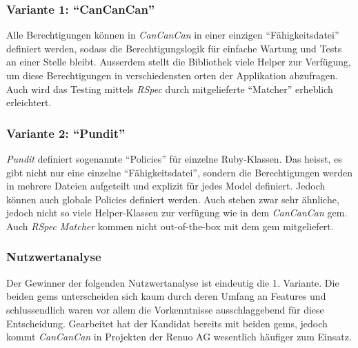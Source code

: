 \subsubsection{Variante 1: \enquote{CanCanCan}}

Alle Berechtigungen können in \emph{CanCanCan} in einer einzigen \enquote{Fähigkeitsdatei} definiert werden, sodass die Berechtigungslogik für einfache Wartung und Tests an einer Stelle bleibt.
Ausserdem stellt die Bibliothek viele Helper zur Verfügung, um diese Berechtigungen in verschiedensten orten der Applikation abzufragen. Auch wird das Testing mittels \emph{RSpec} durch mitgelieferte \enquote{Matcher} erheblich erleichtert.

\subsubsection{Variante 2: \enquote{Pundit}}

\emph{Pundit} definiert sogenannte \enquote{Policies} für einzelne Ruby-Klassen. Das heisst, es gibt nicht nur eine einzelne \enquote{Fähigkeitsdatei},
sondern die Berechtigungen werden in mehrere Dateien aufgeteilt und explizit für jedes Model definiert. Jedoch können auch globale Policies definiert werden.
Auch stehen zwar sehr ähnliche, jedoch nicht so viele Helper-Klassen zur verfügung wie in dem \emph{CanCanCan} gem. Auch \emph{RSpec Matcher} kommen nicht out-of-the-box mit dem gem mitgeliefert.

\subsubsection{Nutzwertanalyse}

Der Gewinner der folgenden Nutzwertanalyse ist eindeutig die 1. Variante. Die beiden gems unterscheiden sich kaum durch deren Umfang an Features und schlussendlich waren vor allem die Vorkenntnisse
ausschlaggebend für diese Entscheidung. Gearbeitet hat der Kandidat bereits mit beiden gems, jedoch kommt \emph{CanCanCan} in Projekten der Renuo AG wesentlich häufiger zum Einsatz.

